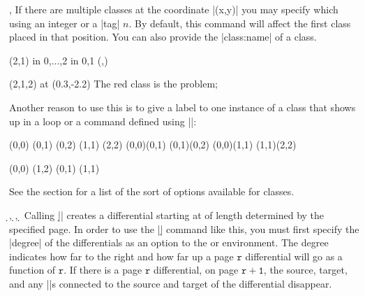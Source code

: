 \begin{sseqdata}[|| name = ex1, cohomological Serre grading]
\begin{commandlist}{{\classoptions\moptions{}},\classoptions\moptions{}}
If there are multiple classes at the coordinate |(x,y)| you may specify which using an integer or a |tag| $n$. By default, this command will affect the first class placed in that position. You can also provide the |class:name| of a class.
\begin{codeexample}[width = 6cm]
\begin{sseqdata}[ name = class options example,
                  classes = fill ]
\class(2,1)
\foreach \x in {0,...,2} \foreach \y in {0,1} {
    \class(\x,\y)
}
\end{sseqdata}
\begin{sseqpage}[ name = class options example,
                  right clip padding = 0.6cm ]
\classoptions[red](2,1,2) %
\node[ background, text width = 10em ] at (0.3,-2.2)
    {\textup{The red class is the problem}};
\end{sseqpage}
\end{codeexample}
Another reason to use this is to give a label to one instance of a class that shows up in a loop or a command defined using |\NewSseqGroup|:
\begin{codeexample}[width = 6cm]
\NewSseqGroup\mygroup {} {
    \class(0,0)
    \class(0,1)
    \class(0,2)
    \class(1,1)
    \class(2,2)
    \structline(0,0)(0,1)
    \structline(0,1)(0,2)
    \structline(0,0)(1,1)
    \structline(1,1)(2,2)
}
\begin{sseqpage}[ classes = fill, class labels = { left = 0.3em } ]
\mygroup(0,0)
\mygroup(1,2)
\classoptions["2"](0,1)
\classoptions["\eta"](1,1)
\end{sseqpage}
\end{codeexample}
See the  section for a list of the sort of options available for classes.
\end{commandlist}

\begin{commandlist}{
    {\d\ooptions{}},
    {\d\ooptions{}\pars{\sourcename\opt{,\targetn}}},
    {\d\ooptions{}\pars{\sourcecoord}\pars{\targetcoord}}%
}
Calling |\d{}| creates a differential starting at  of length determined by the specified page. In order to use the |\d| command like this, you must first specify the |degree| of the differentials as an option to the \sseqdataenv\space or \sseqpageenv\space environment. The degree indicates how far to the right and how far up a page $\mathtt{r}$ differential will go as a function of $\mathtt{r}$. If there is a page $\mathtt{r}$ differential, on page $\mathtt{r+1}$, the source, target, and any |\structline|s connected to the source and target of the differential disappear.


\end{commandlist}
\end{sseqdata}
